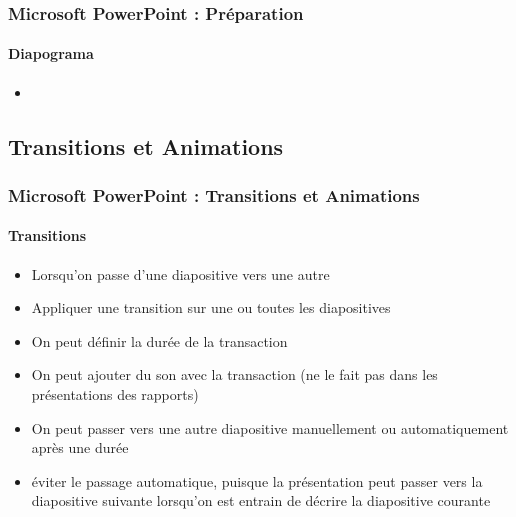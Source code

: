 \documentclass[xcolor=table, usenames,dvipsnames]{beamer}
\begin{document}
\begin{frame}
\frametitle{Microsoft PowerPoint : Préparation}
\framesubtitle{Diapograma}


\begin{minipage}{0.60\textwidth}
	\begin{itemize}
		\item 
	\end{itemize}
\end{minipage}
%
\begin{minipage}{0.39\textwidth}
\end{minipage}

\end{frame}


\subsection{Transitions et Animations}

\begin{frame}
\frametitle{Microsoft PowerPoint : Transitions et Animations}
\framesubtitle{Transitions}


\begin{itemize}
	\item Lorsqu'on passe d'une diapositive vers une autre
	\item Appliquer une transition sur une ou toutes les diapositives
	\item On peut définir la durée de la transaction
	\item On peut ajouter du son avec la transaction (ne le fait pas dans les présentations des rapports)
	\item On peut passer vers une autre diapositive manuellement ou automatiquement après une durée
	\item éviter le passage automatique, puisque la présentation peut passer vers la diapositive suivante lorsqu'on est entrain de décrire la diapositive courante
\end{itemize}

\end{frame}
\end{document}
